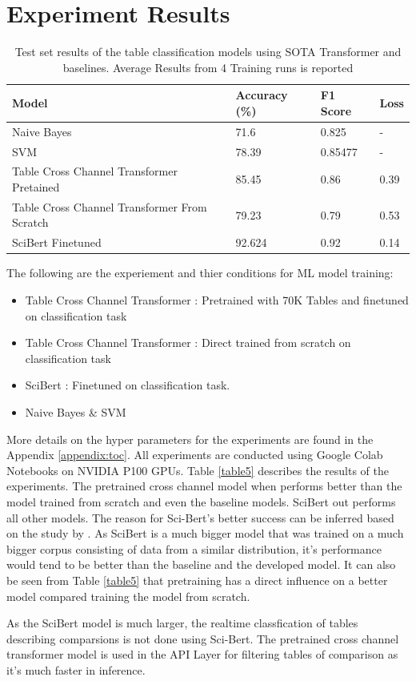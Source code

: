 \section{Experiment Results}
\label{table_classification:experiement-result}
\begin{table}[h]
    \label{table\arabic{tablecounter}}
    \centering
    \begin{tabular}{|l|l|l|l|}
    \hline
        \textbf{Model} & \textbf{Accuracy} (\%) & \textbf{F1 Score}  & \textbf{Loss} \\ \hline
        Naive Bayes & 71.6 & 0.825 & - \\ \hline
        SVM  & 78.39 & 0.85477 & - \\ \hline
        Table Cross Channel Transformer Pretained & 85.45 & 0.86 & 0.39 \\ \hline
        Table Cross Channel Transformer From Scratch & 79.23 & 0.79 & 0.53 \\ \hline
        SciBert Finetuned & 92.624 & 0.92 & 0.14 \\ \hline
    \end{tabular}
    \caption{\label{tablecounter} Test set results of the table classification models using SOTA Transformer and baselines. Average Results from 4 Training runs is reported}
\end{table}
The following are the experiement and thier conditions for ML model training:
\begin{itemize}
    \item Table Cross Channel Transformer : Pretrained with 70K Tables and finetuned on classification task
    \item Table Cross Channel Transformer : Direct trained from scratch on classification task 
    \item SciBert : Finetuned on classification task.
    \item Naive Bayes \& SVM
\end{itemize}
More details on the hyper parameters for the experiments are found in the Appendix \ref{appendix:toc}.
All experiments are conducted using Google Colab Notebooks on NVIDIA P100 GPUs. Table \ref{table5} describes the results of the experiments. The pretrained cross channel model when performs better than the model trained from scratch and even the baseline models. SciBert out performs all other models. The reason for Sci-Bert's better success can be inferred based on the study by \cite{hernandez2021scaling}. As SciBert is a much bigger model that was trained on a much bigger corpus consisting of data from a similar distribution, it's performance would tend to be better than the baseline and the developed model. It can also be seen from Table \ref{table5} that pretraining has a direct influence on a better model compared training the model from scratch. 


As the SciBert model is much larger, the realtime classfication of tables describing comparsions is not done using Sci-Bert. The pretrained cross channel transformer model is used in the API Layer for filtering tables of comparison as it's much faster in inference. 
